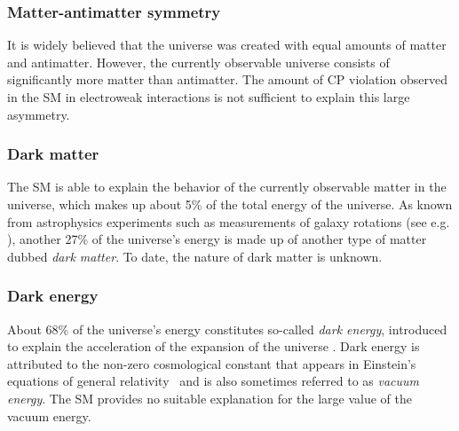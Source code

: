 \subsubsection{Matter-antimatter symmetry}
It is widely believed that the universe was created with equal amounts of matter and antimatter.
However, the currently observable universe consists of significantly more matter than antimatter. 
The amount of CP violation observed in the SM in electroweak interactions is not sufficient to explain this large asymmetry.

\subsubsection{Dark matter}
The SM is able to explain the behavior of the currently observable matter in the universe, which makes up about 5\% of the total energy of the universe. 
As known from astrophysics experiments such as measurements of galaxy rotations (see e.g. ), another 27\% of the universe's energy is made up of another type of matter dubbed \emph{dark matter}. To date, the nature of dark matter is unknown.

\subsubsection{Dark energy}
About 68\% of the universe's energy constitutes so-called \emph{dark energy}, introduced to explain the acceleration of the expansion of the universe \cite{Riess_1998,Perlmutter_1999}. Dark energy is attributed to the non-zero cosmological constant that appears in Einstein's equations of general relativity~\cite{Einstein1916} and is also sometimes referred to as \emph{vacuum energy}. The SM provides no suitable explanation for the large value of the vacuum energy.


